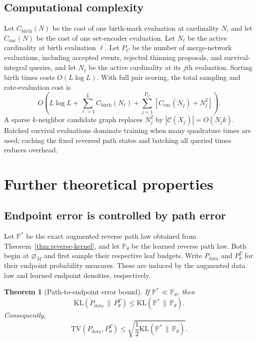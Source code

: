\documentclass[10pt]{article}
\newtheorem{theorem}{Theorem}[section]
\theoremstyle{definition}
\theoremstyle{remark}
\newcommand{\KL}{\mathrm{KL}}
\newcommand{\TV}{\mathrm{TV}}
\newcommand{\emptyconfig}{\varnothing_M}
\begin{document}
\subsection{Computational complexity}

Let $C_{\mathrm{birth}}(N)$ be the cost of one birth-mark evaluation at
cardinality $N$, and let $C_{\mathrm{enc}}(N)$ be the cost of one set-encoder
evaluation.  Let $N_\ell$ be the active cardinality at birth evaluation
$\ell$.  Let $P_C$ be the number of merge-network evaluations, including
accepted events, rejected thinning proposals, and survival-integral queries,
and let $N_j$ be the active cardinality at its $j$th evaluation.  Sorting
birth times costs $O(L\log L)$.  With full pair scoring, the total sampling
and rate-evaluation cost is
\begin{equation}
  O\!\left(
    L\log L
    +\sum_{\ell=1}^{L}C_{\mathrm{birth}}(N_\ell)
    +\sum_{j=1}^{P_C}
      \left[C_{\mathrm{enc}}(N_j)+N_j^2\right]
  \right).
  \label{eq:full-complexity}
\end{equation}
A sparse $k$-neighbor candidate graph replaces $N_j^2$ by
$|\mathcal C(X_j)|=O(N_jk)$.  Batched survival evaluations dominate training
when many quadrature times are used; caching the fixed reversed path states
and batching all queried times reduces overhead.

\section{Further theoretical properties}
\label{sec:properties}

\subsection{Endpoint error is controlled by path error}

Let $\mathbb P^*$ be the exact augmented reverse path law obtained from
Theorem~\ref{thm:reverse-kernel}, and let $\mathbb P_\theta$ be the learned
reverse path law.  Both begin at $\emptyconfig$ and first sample their
respective leaf budgets.  Write $P_{\mathrm{data}}$ and $P_\theta^T$ for
their endpoint probability measures.  These are induced by the augmented
data law and learned endpoint densities, respectively.

\begin{theorem}[Path-to-endpoint error bound]
\label{thm:endpoint-bound}
If $\mathbb P^*\ll\mathbb P_\theta$, then
\begin{equation}
  \KL(P_{\mathrm{data}}\,\|\,P_\theta^T)
  \leq
  \KL(\mathbb P^*\,\|\,\mathbb P_\theta).
  \label{eq:data-processing-kl}
\end{equation}
Consequently,
\begin{equation}
  \TV(P_{\mathrm{data}},P_\theta^T)
  \leq
  \sqrt{\frac12\KL(\mathbb P^*\,\|\,\mathbb P_\theta)}.
  \label{eq:pinsker-endpoint}
\end{equation}
\end{theorem}
\end{document}
